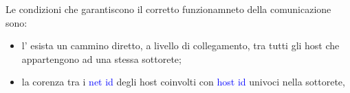 Le condizioni che garantiscono il corretto funzionamneto della comunicazione sono:
\begin{itemize}
    \item l' esista un cammino diretto, a livello di collegamento, tra tutti gli host che appartengono ad una stessa sottorete;
    \item la corenza tra i \textcolor{blue}{net id} degli host coinvolti con \textcolor{blue}{host id} univoci nella sottorete, 
\end{itemize}